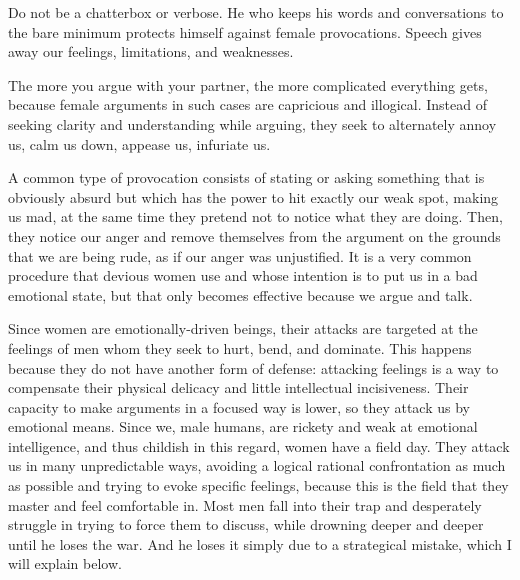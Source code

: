 \par Do not be a chatterbox or verbose. He who keeps his words and conversations to the bare minimum protects himself against female provocations. Speech gives away our feelings, limitations, and weaknesses.

\par The more you argue with your partner, the more complicated everything gets, because female arguments in such cases are capricious and illogical. Instead of seeking clarity and understanding while arguing, they seek to alternately annoy us, calm us down, appease us, infuriate us.

\par A common type of provocation consists of stating or asking something that is obviously absurd but which has the power to hit exactly our weak spot, making us mad, at the same time they pretend not to notice what they are doing. Then, they notice our anger and remove themselves from the argument on the grounds that we are being rude, as if our anger was unjustified. It is a very common procedure that devious women use and whose intention is to put us in a bad emotional state, but that only becomes effective because we argue and talk.

\par Since women are emotionally-driven beings, their attacks are targeted at the feelings of men whom they seek to hurt, bend, and dominate. This happens because they do not have another form of defense: attacking feelings is a way to compensate their physical delicacy and little intellectual incisiveness\footnotemark[32]. Their capacity to make arguments in a focused way is lower, so they attack us by emotional means. Since we, male humans, are rickety and weak at emotional intelligence, and thus childish in this regard, women have a field day. They attack us in many unpredictable ways, avoiding a logical rational confrontation as much as possible and trying to evoke specific feelings, because this is the field that they master and feel comfortable in. Most men fall into their trap and desperately struggle in trying to force them to discuss, while drowning deeper and deeper until he loses the war. And he loses it simply due to a strategical mistake, which I will explain below.


